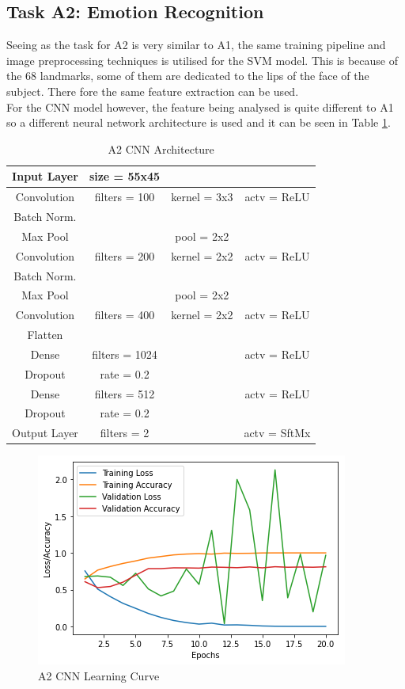 \documentclass{article}
\begin{document}
    \subsection{Task A2: Emotion Recognition}
    Seeing as the task for A2 is very similar to A1, the same training pipeline and image preprocessing techniques is utilised for the SVM model. This is because of the 68 landmarks, some of them are dedicated to the lips of the face of the subject. There fore the same feature extraction can be used.\\
    
    For the CNN model however, the feature being analysed is quite different to A1 so a different neural network architecture is used and it can be seen in Table \ref{table:A2_Arch}.
 	\begin{table}[]
	\begin{tabular}{|c|c c c|}
		\hline
		Input Layer & size = 55x45 	&				&	\\
		\hline
		Convolution & filters = 100 & kernel = 3x3 	& actv = ReLU\\
		\hline
		Batch Norm. & 				&				&\\
		\hline
		Max Pool	&				& pool = 2x2  	& \\
		\hline
		Convolution & filters = 200 & kernel = 2x2 	& actv = ReLU\\
		\hline
		Batch Norm. &				&				&\\
		\hline
		Max Pool	&				& pool = 2x2  	& \\
		\hline
		Convolution & filters = 400 & kernel = 2x2	& actv = ReLU\\
		\hline
		Flatten 	& 				& 				&\\
		\hline
		Dense 		&filters = 1024 &				& actv = ReLU\\
		\hline
		Dropout 	& rate = 0.2 	&	 			&\\
		\hline
		Dense 		& filters = 512 &				& actv = ReLU\\
		\hline
		Dropout 	& rate = 0.2 	& 				&\\
		\hline
		Output Layer& filters = 2 	&				&actv = SftMx\\
		\hline
	\end{tabular}
	\caption{A2 CNN Architecture}
	\label{table:A2_Arch}
	\end{table}
    \begin{figure}[htb]
    	\centering
    	\includegraphics[scale=0.7]{Figures/A2_CNN_Graph.PNG}
    	\caption{A2 CNN Learning Curve}
    	\label{fig:A2_curve}
    \end{figure} 
\end{document}
